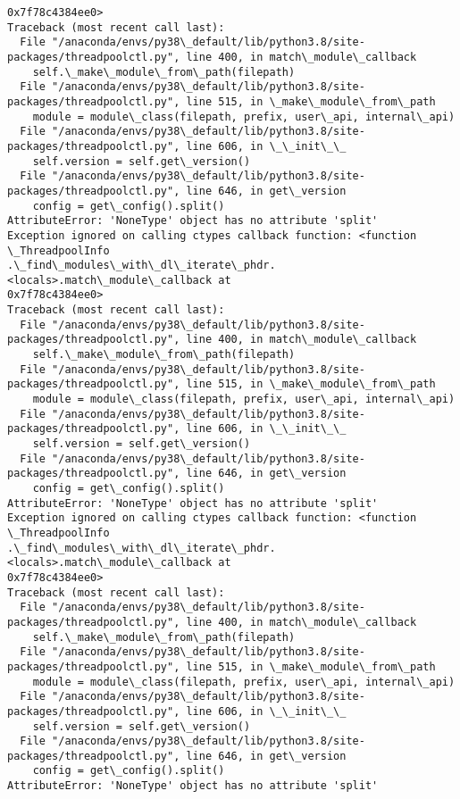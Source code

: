 \documentclass[11pt]{article}
\begin{document}
\begin{Verbatim}[commandchars=\\\{\}]
0x7f78c4384ee0>
Traceback (most recent call last):
  File "/anaconda/envs/py38\_default/lib/python3.8/site-
packages/threadpoolctl.py", line 400, in match\_module\_callback
    self.\_make\_module\_from\_path(filepath)
  File "/anaconda/envs/py38\_default/lib/python3.8/site-
packages/threadpoolctl.py", line 515, in \_make\_module\_from\_path
    module = module\_class(filepath, prefix, user\_api, internal\_api)
  File "/anaconda/envs/py38\_default/lib/python3.8/site-
packages/threadpoolctl.py", line 606, in \_\_init\_\_
    self.version = self.get\_version()
  File "/anaconda/envs/py38\_default/lib/python3.8/site-
packages/threadpoolctl.py", line 646, in get\_version
    config = get\_config().split()
AttributeError: 'NoneType' object has no attribute 'split'
Exception ignored on calling ctypes callback function: <function \_ThreadpoolInfo
.\_find\_modules\_with\_dl\_iterate\_phdr.<locals>.match\_module\_callback at
0x7f78c4384ee0>
Traceback (most recent call last):
  File "/anaconda/envs/py38\_default/lib/python3.8/site-
packages/threadpoolctl.py", line 400, in match\_module\_callback
    self.\_make\_module\_from\_path(filepath)
  File "/anaconda/envs/py38\_default/lib/python3.8/site-
packages/threadpoolctl.py", line 515, in \_make\_module\_from\_path
    module = module\_class(filepath, prefix, user\_api, internal\_api)
  File "/anaconda/envs/py38\_default/lib/python3.8/site-
packages/threadpoolctl.py", line 606, in \_\_init\_\_
    self.version = self.get\_version()
  File "/anaconda/envs/py38\_default/lib/python3.8/site-
packages/threadpoolctl.py", line 646, in get\_version
    config = get\_config().split()
AttributeError: 'NoneType' object has no attribute 'split'
Exception ignored on calling ctypes callback function: <function \_ThreadpoolInfo
.\_find\_modules\_with\_dl\_iterate\_phdr.<locals>.match\_module\_callback at
0x7f78c4384ee0>
Traceback (most recent call last):
  File "/anaconda/envs/py38\_default/lib/python3.8/site-
packages/threadpoolctl.py", line 400, in match\_module\_callback
    self.\_make\_module\_from\_path(filepath)
  File "/anaconda/envs/py38\_default/lib/python3.8/site-
packages/threadpoolctl.py", line 515, in \_make\_module\_from\_path
    module = module\_class(filepath, prefix, user\_api, internal\_api)
  File "/anaconda/envs/py38\_default/lib/python3.8/site-
packages/threadpoolctl.py", line 606, in \_\_init\_\_
    self.version = self.get\_version()
  File "/anaconda/envs/py38\_default/lib/python3.8/site-
packages/threadpoolctl.py", line 646, in get\_version
    config = get\_config().split()
AttributeError: 'NoneType' object has no attribute 'split'

\end{Verbatim}
\end{document}
